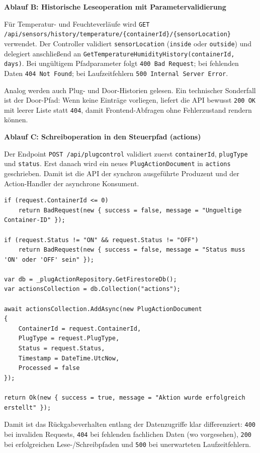 \textbf{Ablauf B: Historische Leseoperation mit Parametervalidierung}

Für Temperatur- und Feuchteverläufe wird \texttt{GET /api/sensors/history/temperature/\{containerId\}/\{sensorLocation\}} verwendet. Der Controller validiert \texttt{sensorLocation} (\texttt{inside} oder \texttt{outside}) und delegiert anschließend an \texttt{GetTemperatureHumidityHistory(containerId, days)}. Bei ungültigem Pfadparameter folgt \texttt{400 Bad Request}; bei fehlenden Daten \texttt{404 Not Found}; bei Laufzeitfehlern \texttt{500 Internal Server Error}.

Analog werden auch Plug- und Door-Historien gelesen. Ein technischer Sonderfall ist der Door-Pfad: Wenn keine Einträge vorliegen, liefert die API bewusst \texttt{200 OK} mit leerer Liste statt \texttt{404}, damit Frontend-Abfragen ohne Fehlerzustand rendern können.

\textbf{Ablauf C: Schreiboperation in den Steuerpfad (actions)}

Der Endpoint \texttt{POST /api/plugcontrol} validiert zuerst \texttt{containerId}, \texttt{plugType} und \texttt{status}. Erst danach wird ein neues \texttt{PlugActionDocument} in \texttt{actions} geschrieben. Damit ist die API der synchron ausgeführte Produzent und der Action-Handler der asynchrone Konsument.

\begin{lstlisting}[language={[Sharp]C},caption={Validierter Write-Path für Steueraktionen},label={lst:db:ops:action-write},basicstyle=\ttfamily\small,breaklines=true,breakatwhitespace=false,columns=fullflexible]
if (request.ContainerId <= 0)
    return BadRequest(new { success = false, message = "Ungueltige Container-ID" });

if (request.Status != "ON" && request.Status != "OFF")
    return BadRequest(new { success = false, message = "Status muss 'ON' oder 'OFF' sein" });

var db = _plugActionRepository.GetFirestoreDb();
var actionsCollection = db.Collection("actions");

await actionsCollection.AddAsync(new PlugActionDocument
{
    ContainerId = request.ContainerId,
    PlugType = request.PlugType,
    Status = request.Status,
    Timestamp = DateTime.UtcNow,
    Processed = false
});

return Ok(new { success = true, message = "Aktion wurde erfolgreich erstellt" });
\end{lstlisting}

Damit ist das Rückgabeverhalten entlang der Datenzugriffe klar differenziert: \texttt{400} bei invaliden Requests, \texttt{404} bei fehlenden fachlichen Daten (wo vorgesehen), \texttt{200} bei erfolgreichen Lese-/Schreibpfaden und \texttt{500} bei unerwarteten Laufzeitfehlern.

